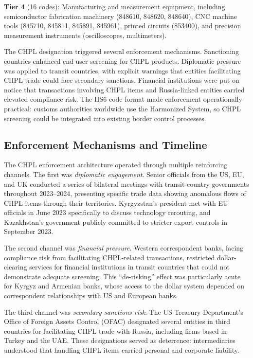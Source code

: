 \documentclass[12pt]{article}
\begin{document}
\textbf{Tier 4} (16 codes): Manufacturing and measurement equipment, including semiconductor fabrication machinery (848610, 848620, 848640), CNC machine tools (845710, 845811, 845891, 845961), printed circuits (853400), and precision measurement instruments (oscilloscopes, multimeters).

The CHPL designation triggered several enforcement mechanisms. Sanctioning countries enhanced end-user screening for CHPL products. Diplomatic pressure was applied to transit countries, with explicit warnings that entities facilitating CHPL trade could face secondary sanctions. Financial institutions were put on notice that transactions involving CHPL items and Russia-linked entities carried elevated compliance risk. The HS6 code format made enforcement operationally practical: customs authorities worldwide use the Harmonized System, so CHPL screening could be integrated into existing border control processes.

\subsection{Enforcement Mechanisms and Timeline}

The CHPL enforcement architecture operated through multiple reinforcing channels. The first was \textit{diplomatic engagement}. Senior officials from the US, EU, and UK conducted a series of bilateral meetings with transit-country governments throughout 2023--2024, presenting specific trade data showing anomalous flows of CHPL items through their territories. Kyrgyzstan's president met with EU officials in June 2023 specifically to discuss technology rerouting, and Kazakhstan's government publicly committed to stricter export controls in September 2023.

The second channel was \textit{financial pressure}. Western correspondent banks, facing compliance risk from facilitating CHPL-related transactions, restricted dollar-clearing services for financial institutions in transit countries that could not demonstrate adequate screening. This ``de-risking'' effect was particularly acute for Kyrgyz and Armenian banks, whose access to the dollar system depended on correspondent relationships with US and European banks.

The third channel was \textit{secondary sanctions risk}. The US Treasury Department's Office of Foreign Assets Control (OFAC) designated several entities in third countries for facilitating CHPL trade with Russia, including firms based in Turkey and the UAE. These designations served as deterrence: intermediaries understood that handling CHPL items carried personal and corporate liability.
\end{document}
